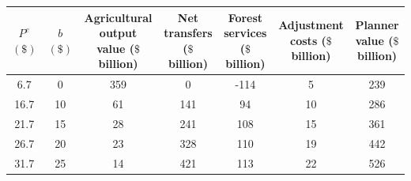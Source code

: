 \begin{tabular}{ccccccc}
\toprule
\makecell[c]{$P^e$ \\ $(\$)$} & \makecell[c]{$b$ \\ $(\$)$} & \makecell[c]{Agricultural \\ output value \\ ($\$$ billion)} & \makecell[c]{Net \\ transfers \\ ($\$$ billion)} & \makecell[c]{Forest \\ services \\ ($\$$ billion)} & \makecell[c]{Adjustment \\ costs \\ ($\$$ billion)} & \makecell[c]{Planner \\ value \\ ($\$$ billion)} \\
\midrule
 6.7 & 0 & 359 & 0 & -114 & 5 & 239 \\
 16.7 & 10 & 61 & 141 & 94 & 10 & 286 \\
 21.7 & 15 & 28 & 241 & 108 & 15 & 361 \\
 26.7 & 20 & 23 & 328 & 110 & 19 & 442 \\
 31.7 & 25 & 14 & 421 & 113 & 22 & 526 \\
\bottomrule
\end{tabular}
